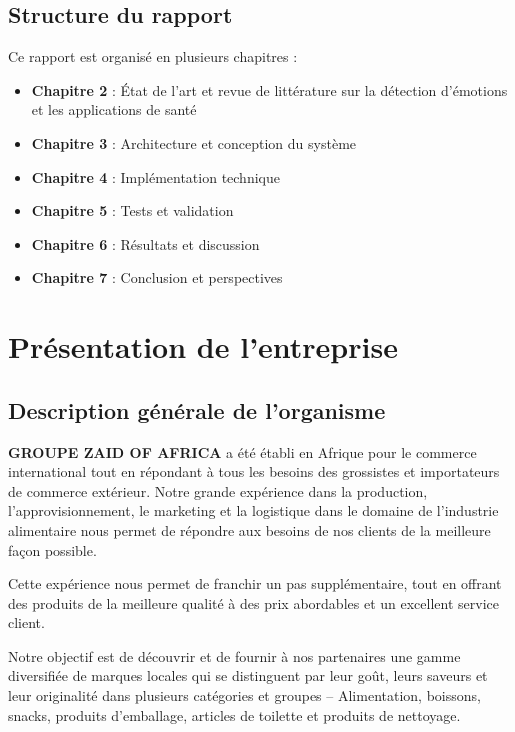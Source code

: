 \documentclass[a4paper,11pt]{report}
\begin{document}
\section{Structure du rapport}

Ce rapport est organisé en plusieurs chapitres :

\begin{itemize}
    \item \textbf{Chapitre 2} : État de l'art et revue de littérature sur la détection d'émotions et les applications de santé
    \item \textbf{Chapitre 3} : Architecture et conception du système
    \item \textbf{Chapitre 4} : Implémentation technique
    \item \textbf{Chapitre 5} : Tests et validation
    \item \textbf{Chapitre 6} : Résultats et discussion
    \item \textbf{Chapitre 7} : Conclusion et perspectives
\end{itemize}

\chapter{Présentation de l’entreprise}

\section{Description générale de l’organisme}

\textbf{GROUPE ZAID OF AFRICA} a été établi en Afrique pour le commerce international tout en répondant à tous les besoins des grossistes et importateurs de commerce extérieur. Notre grande expérience dans la production, l'approvisionnement, le marketing et la logistique dans le domaine de l'industrie alimentaire nous permet de répondre aux besoins de nos clients de la meilleure façon possible.

Cette expérience nous permet de franchir un pas supplémentaire, tout en offrant des produits de la meilleure qualité à des prix abordables et un excellent service client.

Notre objectif est de découvrir et de fournir à nos partenaires une gamme diversifiée de marques locales qui se distinguent par leur goût, leurs saveurs et leur originalité dans plusieurs catégories et groupes – Alimentation, boissons, snacks, produits d'emballage, articles de toilette et produits de nettoyage.
\end{document}
